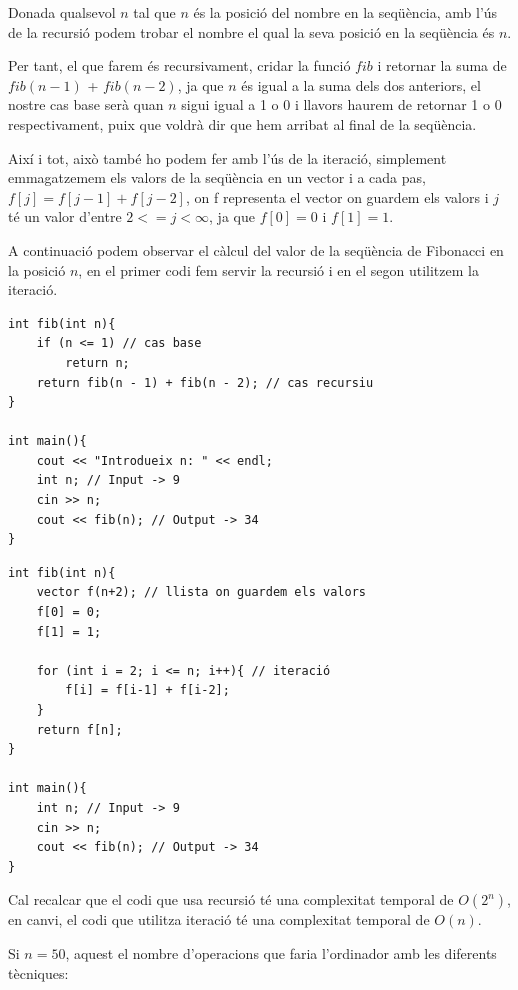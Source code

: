 \newpage

Donada qualsevol $n$ tal que $n$ és la posició del nombre en la seqüència, amb l'ús de la recursió podem trobar el nombre el qual la seva posició en la seqüència és $n$.

Per tant, el que farem és recursivament, cridar la funció $fib$ i retornar la suma de $fib(n - 1)$ + $fib(n - 2)$, ja que $n$ és igual a la suma dels dos anteriors, el nostre cas base serà quan $n$ sigui igual a 1 o 0 i llavors haurem de retornar 1 o 0 respectivament, puix que voldrà dir que hem arribat al final de la seqüència. \newline

Així i tot, això també ho podem fer amb l'ús de la iteració, simplement emmagatzemem els valors de la seqüència en un vector i a cada pas, $f[j] = f[j-1] + f[j-2]$, on f representa el vector on guardem els valors i $j$ té un valor d'entre $2 <= j < \infty$, ja que $f[0] = 0$ i $f[1] = 1$. \newline

A continuació podem observar el càlcul del valor de la seqüència de Fibonacci en la posició $n$, en el primer codi fem servir la recursió i en el segon utilitzem la iteració. \newline

\begin{lstlisting}
int fib(int n){
    if (n <= 1) // cas base
        return n;
    return fib(n - 1) + fib(n - 2); // cas recursiu
}

int main(){
    cout << "Introdueix n: " << endl;
    int n; // Input -> 9
    cin >> n;
    cout << fib(n); // Output -> 34
}
\end{lstlisting}

\begin{lstlisting}
int fib(int n){
    vector f(n+2); // llista on guardem els valors
    f[0] = 0;
    f[1] = 1;
    
    for (int i = 2; i <= n; i++){ // iteració
        f[i] = f[i-1] + f[i-2];
    }
    return f[n];
}

int main(){
    int n; // Input -> 9
    cin >> n;
    cout << fib(n); // Output -> 34
}
\end{lstlisting}

Cal recalcar que el codi que usa recursió té una complexitat temporal de $O(2^n)$, en canvi, el codi que utilitza iteració té una complexitat temporal de $O(n)$.

Si $n = 50$, aquest el nombre d'operacions que faria l'ordinador amb les diferents tècniques: \newline


